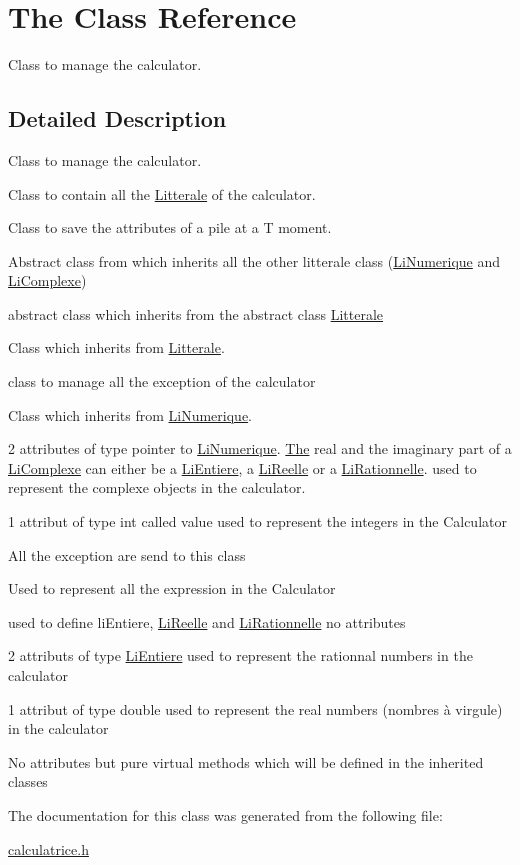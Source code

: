 \hypertarget{class_the}{}\section{The Class Reference}
\label{class_the}


Class to manage the calculator.  




\subsection{Detailed Description}
Class to manage the calculator. 

Class to contain all the \hyperlink{class_litterale}{Litterale} of the calculator.

Class to save the attributes of a pile at a T moment.

Abstract class from which inherits all the other litterale class (\hyperlink{class_li_numerique}{Li\+Numerique} and \hyperlink{class_li_complexe}{Li\+Complexe})

abstract class which inherits from the abstract class \hyperlink{class_litterale}{Litterale}

Class which inherits from \hyperlink{class_litterale}{Litterale}.

class to manage all the exception of the calculator

Class which inherits from \hyperlink{class_li_numerique}{Li\+Numerique}.

2 attributes of type pointer to \hyperlink{class_li_numerique}{Li\+Numerique}. \hyperlink{class_the}{The} real and the imaginary part of a \hyperlink{class_li_complexe}{Li\+Complexe} can either be a \hyperlink{class_li_entiere}{Li\+Entiere}, a \hyperlink{class_li_reelle}{Li\+Reelle} or a \hyperlink{class_li_rationnelle}{Li\+Rationnelle}. used to represent the complexe objects in the calculator.

1 attribut of type int called value used to represent the integers in the Calculator

All the exception are send to this class

Used to represent all the expression in the Calculator

used to define li\+Entiere, \hyperlink{class_li_reelle}{Li\+Reelle} and \hyperlink{class_li_rationnelle}{Li\+Rationnelle} no attributes

2 attributs of type \hyperlink{class_li_entiere}{Li\+Entiere} used to represent the rationnal numbers in the calculator

1 attribut of type double used to represent the real numbers (nombres à virgule) in the calculator

No attributes but pure virtual methods which will be defined in the inherited classes 

The documentation for this class was generated from the following file\+:\begin{DoxyCompactItemize}
\item 
\hyperlink{calculatrice_8h}{calculatrice.\+h}\end{DoxyCompactItemize}

